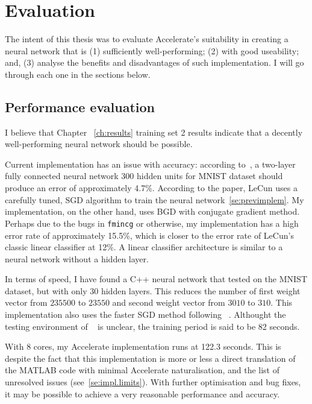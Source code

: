 \chapter{Evaluation}\label{ch:eval}

The intent of this thesis was to evaluate Accelerate's suitability in creating a neural network that is (1) sufficiently well-performing; (2) with good useability; and, (3) analyse the benefits and disadvantages of such implementation. I will go through each one in the sections below.

\section{Performance evaluation} \label{se:eval.performance}

I believe that Chapter ~\ref{ch:results} training set 2 results indicate that a decently well-performing neural network should be possible.

Current implementation has an issue with accuracy: according to~\cite{LeC98}, a two-layer fully connected neural network 300 hidden units for MNIST dataset should produce an error of approximately 4.7\%. According to the paper, LeCun uses a carefully tuned, SGD algorithm to train the neural network~\ref{se:previmplem}. My implementation, on the other hand, uses BGD with conjugate gradient method. Perhaps due to the bugs in \texttt{fmincg} or otherwise, my implementation has a high error rate of approximately 15.5\%, which is closer to the error rate of LeCun's classic linear classifier at 12\%. A linear classifier architecture is similar to a neural network without a hidden layer.

In terms of speed, I have found a C++ neural network that tested on the MNIST dataset\cite{Wol17}, but with only 30 hidden layers. This reduces the number of first weight vector from $235500$ to $23550$ and second weight vector from $3010$ to $310$. This implementation also uses the faster SGD method following ~\cite{LeC98}. Althought the testing environment of ~\cite{Wol17} is unclear, the training period is said to be 82 seconds.

With 8 cores, my Accelerate implementation runs at 122.3 seconds. This is despite the fact that this implementation is more or less a direct translation of the MATLAB code with minimal Accelerate naturalisation, and the list of unresolved issues (see~\ref{se:impl.limits}). With further optimisation and bug fixes, it may be possible to achieve a very reasonable performance and accuracy. 


